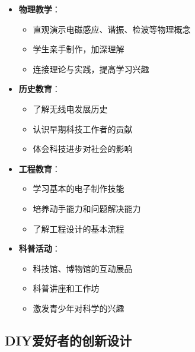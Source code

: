 \documentclass[12pt,UTF8]{ctexbook}
\begin{document}
\begin{itemize}[leftmargin=3.5em]
    \item \textbf{物理教学}：
        \begin{itemize}[leftmargin=3.5em]
            \item 直观演示电磁感应、谐振、检波等物理概念
            \item 学生亲手制作，加深理解
            \item 连接理论与实践，提高学习兴趣
        \end{itemize}
    \item \textbf{历史教育}：
        \begin{itemize}[leftmargin=3.5em]
            \item 了解无线电发展历史
            \item 认识早期科技工作者的贡献
            \item 体会科技进步对社会的影响
        \end{itemize}
    \item \textbf{工程教育}：
        \begin{itemize}[leftmargin=3.5em]
            \item 学习基本的电子制作技能
            \item 培养动手能力和问题解决能力
            \item 了解工程设计的基本流程
        \end{itemize}
    \item \textbf{科普活动}：
        \begin{itemize}[leftmargin=3.5em]
            \item 科技馆、博物馆的互动展品
            \item 科普讲座和工作坊
            \item 激发青少年对科学的兴趣
        \end{itemize}
\end{itemize}

\subsection{DIY爱好者的创新设计}
\end{document}
